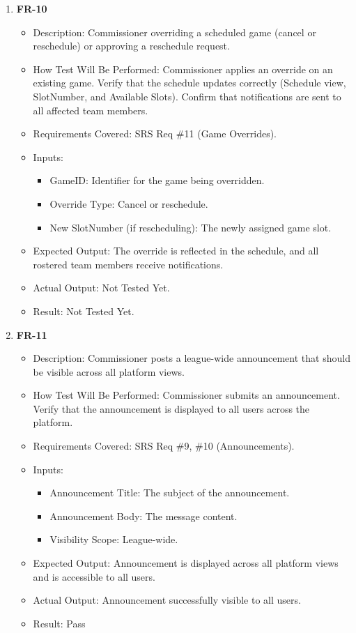 \documentclass[12pt, titlepage]{article}
\begin{document}
\begin{enumerate}
    \item \textbf{FR-10}  
      \begin{itemize}
          \item Description: Commissioner overriding a scheduled game (cancel or reschedule) or approving a reschedule request.
          \item How Test Will Be Performed: Commissioner applies an override on an existing game. Verify that the schedule updates correctly (Schedule view, SlotNumber, and Available Slots). Confirm that notifications are sent to all affected team members.
          \item Requirements Covered: SRS Req \#11 (Game Overrides).
          \item Inputs:  
              \begin{itemize}
                  \item GameID: Identifier for the game being overridden.  
                  \item Override Type: Cancel or reschedule.  
                  \item New SlotNumber (if rescheduling): The newly assigned game slot.  
              \end{itemize}
          \item Expected Output: The override is reflected in the schedule, and all rostered team members receive notifications.
          \item Actual Output: Not Tested Yet.
          \item Result: Not Tested Yet.
      \end{itemize}

      \item \textbf{FR-11}  
      \begin{itemize}
          \item Description: Commissioner posts a league-wide announcement that should be visible across all platform views.
          \item How Test Will Be Performed: Commissioner submits an announcement. Verify that the announcement is displayed to all users across the platform.
          \item Requirements Covered: SRS Req \#9, \#10 (Announcements).
          \item Inputs:  
              \begin{itemize}
                  \item Announcement Title: The subject of the announcement.
                  \item Announcement Body: The message content.
                  \item Visibility Scope: League-wide.
              \end{itemize}
          \item Expected Output: Announcement is displayed across all platform views and is accessible to all users.
          \item Actual Output: Announcement successfully visible to all users.
          \item Result: Pass
      \end{itemize}
\end{enumerate}
\end{document}
